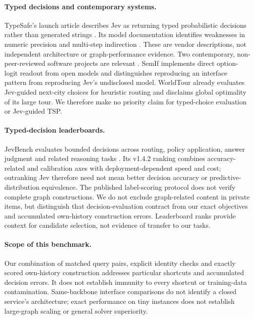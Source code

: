 \paragraph{Typed decisions and contemporary systems.}
TypeSafe's launch article describes Jev as returning typed probabilistic
decisions rather than generated strings \cite{almeida2026jev}.
Its model documentation identifies weaknesses in numeric precision and
multi-step indirection \cite{typesafe2026jaggedness}.
These are vendor descriptions, not independent architecture or graph-performance
evidence. Two contemporary, non-peer-reviewed software projects are relevant
\cite{semif2026,worldtour2026}. SemIf implements direct option-logit readout
from open models and distinguishes reproducing an interface pattern from
reproducing Jev's undisclosed model. WorldTour already evaluates Jev-guided
next-city choices for heuristic routing and disclaims global optimality of its
large tour. We therefore make no priority claim for typed-choice evaluation
or Jev-guided TSP.

\paragraph{Typed-decision leaderboards.}
JevBench evaluates bounded decisions across routing, policy application,
answer judgment and related reasoning tasks \cite{jevbench2026}.
Its v1.4.2 ranking combines accuracy-related and calibration axes with
deployment-dependent speed and cost; outranking Jev therefore need not mean
better decision accuracy or predictive-distribution equivalence.
The published label-scoring protocol does not verify complete graph
constructions. We do not exclude graph-related content in private items,
but distinguish that decision-evaluation contract from our exact objectives
and accumulated own-history construction errors. Leaderboard ranks provide
context for candidate selection, not evidence of transfer to our tasks.

\paragraph{Scope of this benchmark.}
Our combination of matched query pairs, explicit identity checks and
exactly scored own-history construction addresses particular shortcuts and
accumulated decision errors. It does not establish immunity to every shortcut
or training-data contamination. Same-backbone interface comparisons do not
identify a closed service's architecture; exact performance on tiny instances
does not establish large-graph scaling or general solver superiority.

